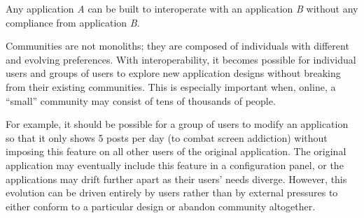 





\begin{requirement}
\label{requirements:adversarial-interop}
Any application \emph{A} can be built to interoperate with an application \emph{B} without any compliance from application \emph{B}.
\end{requirement}

Communities are not monoliths; they are composed of individuals
with different and evolving preferences.
With interoperability, it becomes possible for individual users and groups of users to explore new application designs
without breaking from their existing communities.
This is especially important when, online, a ``small''
community may consist of tens of thousands of people.

For example, it should be possible for a group of users to
modify an application so that it only shows 5 posts per day (to combat screen addiction)
without imposing this feature on all other users of the original application.
The original application may eventually include this feature in a configuration panel,
or the applications may drift further apart as their users' needs diverge. However, this
evolution can be driven entirely by users rather than by external pressures
to either conform to a particular design or abandon community altogether.

